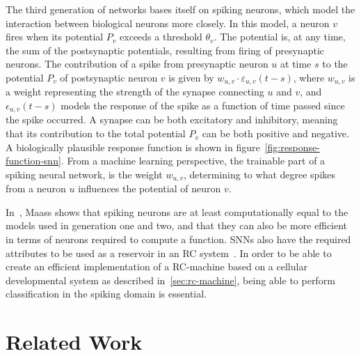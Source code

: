 The third generation of networks bases itself on spiking neurons, which model the interaction between biological neurons more closely.
In this model, a neuron $v$ fires when its potential $P_v$ exceeds a threshold $\theta_v$.
The potential is, at any time, the sum of the postsynaptic potentials, resulting from firing of presynaptic neurons.
The contribution of a spike from presynaptic neuron $u$ at time $s$ to the potential $P_v$ of postsynaptic neuron $v$ is given by $w_{u,v} \cdot \varepsilon_{u,v}(t-s)$, where $w_{u,v}$ is a weight representing the strength of the synapse connecting $u$ and $v$, and $\epsilon_{u,v}(t-s)$ models the response of the spike as a function of time passed since the spike occurred.
A synapse can be both excitatory and inhibitory, meaning that its contribution to the total potential $P_v$ can be both positive and negative.
A biologically plausible response function is shown in figure~\ref{fig:response-function-snn}.
From a machine learning perspective, the trainable part of a spiking neural network, is the weight $w_{u,v}$, determining to what degree spikes from a neuron $u$ influences the potential of neuron $v$.

In~\cite{Maass1997}, Maass shows that spiking neurons are at least computationally equal to the models used in generation one and two, and that they can also be more efficient in terms of neurons required to compute a function.
SNNs also have the required attributes to be used as a reservoir in an RC system~\cite{Pipa2010}.
In order to be able to create an efficient implementation of a RC-machine based on a cellular developmental system as described in~\ref{sec:rc-machine}, being able to perform classification in the spiking domain is essential.

\section{Related Work}
\cleardoublepage

